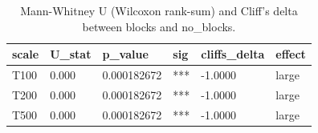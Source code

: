 \begin{table}[htbp]
\centering
\caption{Mann-Whitney U (Wilcoxon rank-sum) and Cliff's delta between blocks and no_blocks.}
\label{tab:wilcoxon_cliffs}
\begin{tabular}{llllll}
\toprule
scale & U_stat & p_value & sig & cliffs_delta & effect \\
\midrule
T100 & 0.000 & 0.000182672 & *** & -1.0000 & large \\
T200 & 0.000 & 0.000182672 & *** & -1.0000 & large \\
T500 & 0.000 & 0.000182672 & *** & -1.0000 & large \\
\bottomrule
\end{tabular}
\end{table}
